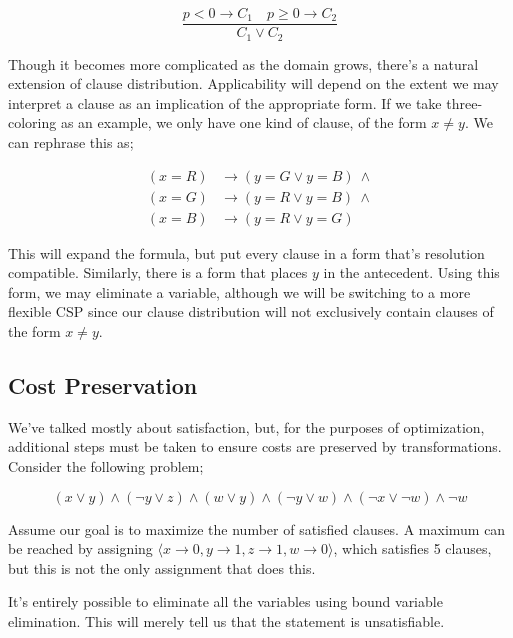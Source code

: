\begin{equation}\label{equation:binary-resolution-Z}
\frac{p < 0 \rightarrow C_1 \quad p \geq 0 \rightarrow C_2}{C_1 \lor C_2}
\end{equation}

Though it becomes more complicated as the domain grows, there's a natural extension of clause distribution. Applicability will depend on the extent we may interpret a clause as an implication of the appropriate form. If we take three-coloring as an example, we only have one kind of clause, of the form $x \neq y$. We can rephrase this as;

\begin{align}
    (x = R) &\rightarrow (y = G \vee y = B)\ \wedge \nonumber \\
    (x = G) &\rightarrow (y = R \vee y = B)\ \wedge \nonumber \\
    (x = B) &\rightarrow (y = R \vee y = G)\label{eq:multiline}
\end{align}

This will expand the formula, but put every clause in a form that's resolution compatible. Similarly, there is a form that places $y$ in the antecedent. Using this form, we may eliminate a variable, although we will be switching to a more flexible CSP since our clause distribution will not exclusively contain clauses of the form $x \neq y$.

\subsection{Cost Preservation}\label{sec:cost-preservation}

We've talked mostly about satisfaction, but, for the purposes of optimization, additional steps must be taken to ensure costs are preserved by transformations. Consider the following problem;

\begin{equation}
    (x \vee y) \wedge (\neg y \vee z) \wedge (w \vee y) \wedge (\neg y \vee w) \wedge (\neg x \vee \neg w) \wedge \neg w
\end{equation}

Assume our goal is to maximize the number of satisfied clauses. A maximum can be reached by assigning $\langle x \rightarrow 0, y \rightarrow 1, z \rightarrow 1, w \rightarrow 0 \rangle$, which satisfies 5 clauses, but this is not the only assignment that does this. 

It's entirely possible to eliminate all the variables using bound variable elimination. This will merely tell us that the statement is unsatisfiable.

